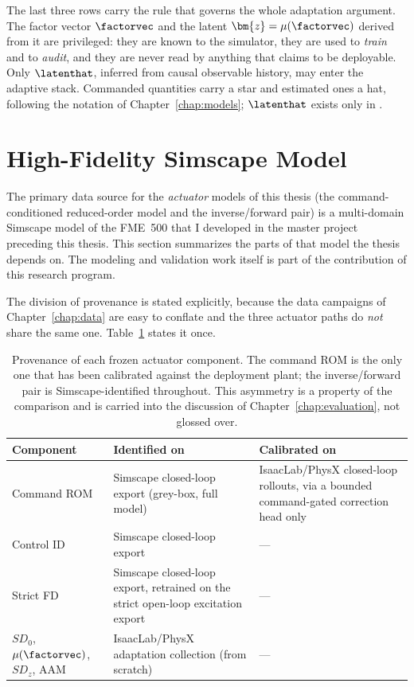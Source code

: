 The last three rows carry the rule that governs the whole adaptation
argument. The factor vector $\factorvec$ and the latent
$\bm{z} = \mu(\factorvec)$ derived from it are privileged: they are
known to the simulator, they are used to \emph{train} and to
\emph{audit}, and they are never read by anything that claims to be
deployable. Only $\latenthat$, inferred from causal observable history,
may enter the adaptive stack. Commanded quantities carry a star and
estimated ones a hat, following the notation of
Chapter~\ref{chap:models}; $\latenthat$ exists only in \ppoIDAAMFD.

\section{High-Fidelity Simscape Model}
\label{sec:sys:simscape}

The primary data source for the \emph{actuator} models of this thesis
(the command-conditioned reduced-order model and the inverse/forward
pair) is a multi-domain Simscape model of the FME~500 that I
developed in the master project preceding this thesis. This section
summarizes the parts of that model the thesis depends on. The modeling
and validation work itself is part of the contribution of this research
program.

The division of provenance is stated explicitly, because the data campaigns
of Chapter~\ref{chap:data} are easy to conflate and the three actuator
paths do \emph{not} share the same one.
Table~\ref{tab:sys:provenance} states it once.

\begin{table}[tb]
  \centering
  \caption{Provenance of each frozen actuator component. The command ROM
  is the only one that has been calibrated against the deployment plant;
  the inverse/forward pair is Simscape-identified throughout. This
  asymmetry is a property of the comparison and is carried into the
  discussion of Chapter~\ref{chap:evaluation}, not glossed over.}
  \label{tab:sys:provenance}
  \small
  \begin{tabular}{lp{4.4cm}p{5.0cm}}
    \toprule
    Component & Identified on & Calibrated on \\
    \midrule
    Command ROM & Simscape closed-loop export (grey-box, full model)
      & IsaacLab/PhysX closed-loop rollouts, via a bounded command-gated
        correction head only \\
    Control ID & Simscape closed-loop export & --- \\
    Strict FD & Simscape closed-loop export, retrained on the strict
        open-loop excitation export & --- \\
    $SD_0$, $\mu(\factorvec)$, $SD_z$, AAM
      & IsaacLab/PhysX adaptation collection (from scratch) & --- \\
    \bottomrule
  \end{tabular}
\end{table}

